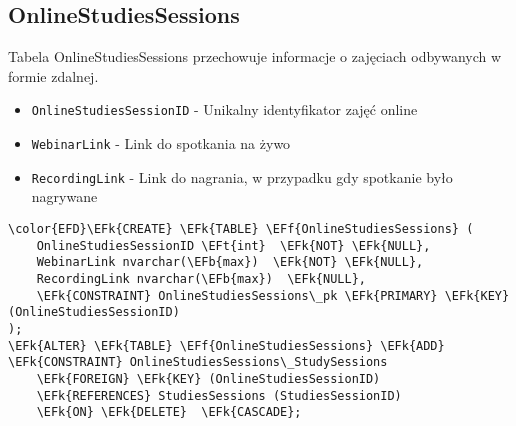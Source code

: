 \documentclass[11pt]{article}
\newcommand{\EFk}[1]{\textcolor{EFk}{\textbf{#1}}} %
\newcommand{\EFb}[1]{\textcolor{EFb}{\textbf{#1}}} %
\newcommand{\EFf}[1]{\textcolor{EFf}{#1}} %
\newcommand{\EFt}[1]{\textcolor{EFt}{\textbf{#1}}} %
\begin{document}
\subsection{OnlineStudiesSessions}
\label{sec:org039378f}
Tabela OnlineStudiesSessions przechowuje informacje o zajęciach odbywanych w formie zdalnej.
\begin{itemize}
\item \texttt{OnlineStudiesSessionID} - Unikalny identyfikator zajęć online
\item \texttt{WebinarLink} - Link do spotkania na żywo
\item \texttt{RecordingLink} - Link do nagrania, w przypadku gdy spotkanie było nagrywane
\end{itemize}
\begin{Code}
\begin{Verbatim}
\color{EFD}\EFk{CREATE} \EFk{TABLE} \EFf{OnlineStudiesSessions} (
    OnlineStudiesSessionID \EFt{int}  \EFk{NOT} \EFk{NULL},
    WebinarLink nvarchar(\EFb{max})  \EFk{NOT} \EFk{NULL},
    RecordingLink nvarchar(\EFb{max})  \EFk{NULL},
    \EFk{CONSTRAINT} OnlineStudiesSessions\_pk \EFk{PRIMARY} \EFk{KEY}  (OnlineStudiesSessionID)
);
\EFk{ALTER} \EFk{TABLE} \EFf{OnlineStudiesSessions} \EFk{ADD} \EFk{CONSTRAINT} OnlineStudiesSessions\_StudySessions
    \EFk{FOREIGN} \EFk{KEY} (OnlineStudiesSessionID)
    \EFk{REFERENCES} StudiesSessions (StudiesSessionID)
    \EFk{ON} \EFk{DELETE}  \EFk{CASCADE};
\end{Verbatim}
\end{Code}
\end{document}
